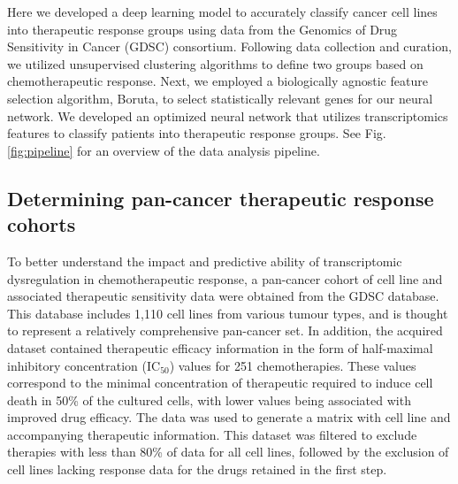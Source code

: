 \documentclass[10pt, letterpaper]{article}
\begin{document}
\begin{multicols*}{2}
Here we developed a deep learning model to accurately classify cancer cell lines into therapeutic response groups using data from the Genomics of Drug Sensitivity in Cancer (GDSC) consortium. Following data collection and curation, we utilized unsupervised clustering algorithms to define two groups based on chemotherapeutic response. Next, we employed a biologically agnostic feature selection algorithm, Boruta, to select statistically relevant genes for our neural network. We developed an optimized neural network that utilizes transcriptomics features to classify patients into therapeutic response groups. See Fig. \ref{fig:pipeline} for an overview of the data analysis pipeline.


\subsection{Determining pan-cancer therapeutic response cohorts}
To better understand the impact and predictive ability of transcriptomic dysregulation in chemotherapeutic response, a pan-cancer cohort of cell line and associated therapeutic sensitivity data were obtained from the GDSC database. This database includes 1,110 cell lines from various tumour types, and is thought to represent a relatively comprehensive pan-cancer set. In addition, the acquired dataset contained therapeutic efficacy information in the form of half-maximal inhibitory concentration (IC$_{50}$) values for 251 chemotherapies. These values correspond to the minimal concentration of therapeutic required to induce cell death in 50\% of the cultured cells, with lower values being associated with improved drug efficacy. The data was used to generate a matrix with cell line and accompanying therapeutic information. This dataset was filtered to exclude therapies with less than 80\% of data for all cell lines, followed by the exclusion of cell lines lacking response data for the drugs retained in the first step.



\end{multicols*}
\end{document}
